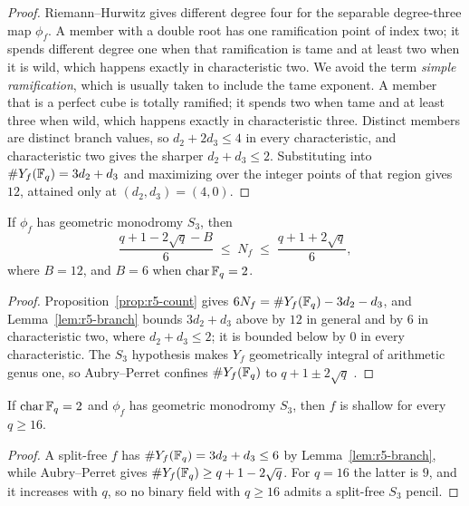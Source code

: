 \begin{proof}
Riemann--Hurwitz gives different degree four for the separable
degree-three map $\phi_f$.  A member with a double root has one
ramification point of index two; it spends different degree one when
that ramification is tame and at least two when it is wild, which
happens exactly in characteristic two.  We avoid the term \emph{simple
ramification}, which is usually taken to include the tame exponent.  A member that is a perfect cube is totally
ramified; it spends two when tame and at least three when wild, which
happens exactly in characteristic three.  Distinct members are distinct
branch values, so $d_2+2d_3\leq4$ in every characteristic, and
characteristic two gives the sharper $d_2+d_3\leq2$.  Substituting into
\(\#Y_f(\mathbb F_q)=3d_2+d_3\) and maximizing over the integer points of
that region gives $12$, attained only at $(d_2,d_3)=(4,0)$.
\end{proof}

\begin{corollary}\label{cor:r5-equidistribution}%
%
%
If $\phi_f$ has geometric monodromy $S_3$, then
\[
 \frac{q+1-2\sqrt q-B}{6}\;\leq\;N_f\;\leq\;\frac{q+1+2\sqrt q}{6},
\]
where $B=12$, and $B=6$ when $\operatorname{char}\mathbb F_q=2$.
\end{corollary}

\begin{proof}
Proposition~\ref{prop:r5-count} gives $6N_f=\#Y_f(\mathbb F_q)-3d_2-d_3$, and
Lemma~\ref{lem:r5-branch} bounds $3d_2+d_3$ above by $12$ in general and
by $6$ in characteristic two, where $d_2+d_3\leq2$; it is bounded below
by $0$ in every characteristic.  The $S_3$ hypothesis makes $Y_f$
geometrically integral of arithmetic genus one, so Aubry--Perret
confines $\#Y_f(\mathbb F_q)$ to $q+1\pm2\sqrt q$
\cite[p.~468]{AubryPerret1995}.
\end{proof}

\begin{corollary}[Binary $S_3$ shallowness above $q=8$]
\label{cor:r5-binary-shallow}%
%
%
%
If $\operatorname{char}\mathbb F_q=2$ and $\phi_f$ has geometric monodromy
$S_3$, then $f$ is shallow for every $q\geq16$.
\end{corollary}

\begin{proof}
A split-free $f$ has $\#Y_f(\mathbb F_q)=3d_2+d_3\leq6$ by
Lemma~\ref{lem:r5-branch}, while Aubry--Perret gives
$\#Y_f(\mathbb F_q)\geq q+1-2\sqrt q$.  For $q=16$ the latter is $9$, and it
increases with $q$, so no binary field with $q\geq16$ admits a split-free
$S_3$ pencil.
\end{proof}

